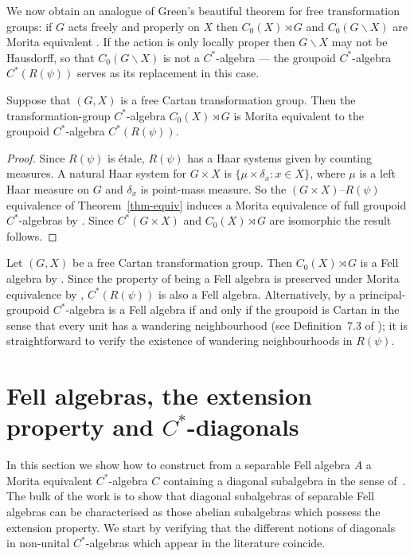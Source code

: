 \documentclass[12pt,a4paper]{amsart}
\newcommand{\under}{\backslash}
\begin{document}
We now obtain an analogue of Green's beautiful theorem for free
transformation groups:  if $G$ acts freely and properly on $X$
then $C_0(X)\rtimes G$ and $C_0(G\backslash X)$ are Morita
equivalent \cite[Theorem~14]{G}.  If the action is only locally
proper then $G\under X$ may not be Hausdorff, so that
$C_0(G\backslash X)$ is not a $C^*$-algebra --- the groupoid
$C^*$-algebra $C^*(R(\psi))$ serves as its replacement in this
case.

\begin{cor} \label{cor-greens}
Suppose that $(G,X)$ is a free Cartan transformation group. Then the
transformation-group $C^*$-algebra $C_0(X)\rtimes G$ is Morita
equivalent to the groupoid $C^*$-algebra $C^*(R(\psi))$.
\end{cor}
\begin{proof}
Since $R(\psi)$ is \'etale,  $R(\psi)$ has
a Haar systems given by counting measures. A natural Haar system for $G\times X$ is $\{\mu\times\delta_x:x\in X\}$, where $\mu$ is a left Haar measure on $G$ and $\delta_x$ is point-mass measure. So  the $(G\times X)$--$R(\psi)$
equivalence of Theorem~\ref{thm-equiv} induces a Morita
equivalence of full groupoid $C^*$-algebras by
\cite[Theorem~2.8]{MRW87}. Since $C^*(G\times X)$ and
$C_0(X)\rtimes G$ are isomorphic \cite[Remarks on p.
59]{Renault1980} the result follows.
\end{proof}

Let $(G,X)$ be a free Cartan transformation group. Then
$C_0(X)\rtimes G$ is a Fell algebra by \cite{aH}. Since the
property of being a Fell algebra is preserved under Morita
equivalence by \cite{aHRW}, $C^*(R(\psi))$ is also a Fell
algebra. Alternatively,  by \cite[Theorem~7.9]{C}  a
principal-groupoid $C^*$-algebra is a Fell algebra if and only
if the groupoid is Cartan in the sense that every unit has a
wandering neighbourhood (see Definition~7.3 of \cite{C}); it is
straightforward to verify the existence of wandering
neighbourhoods in $R(\psi)$.



\section{Fell algebras, the extension property and
\texorpdfstring{$C^*$}{C*}-diagonals}\label{sec:ext props}

In this section we show how to construct from a separable Fell
algebra $A$ a Morita equivalent $C^*$-algebra $C$ containing a
diagonal subalgebra in the sense of~\cite{Kumjian1986}. The
bulk of the work is to show that diagonal subalgebras of
separable Fell algebras can be characterised as those
abelian subalgebras which possess the extension property. We
start by verifying that the different notions of
diagonals in non-unital $C^*$-algebras which appear in the
literature coincide.
\end{document}
